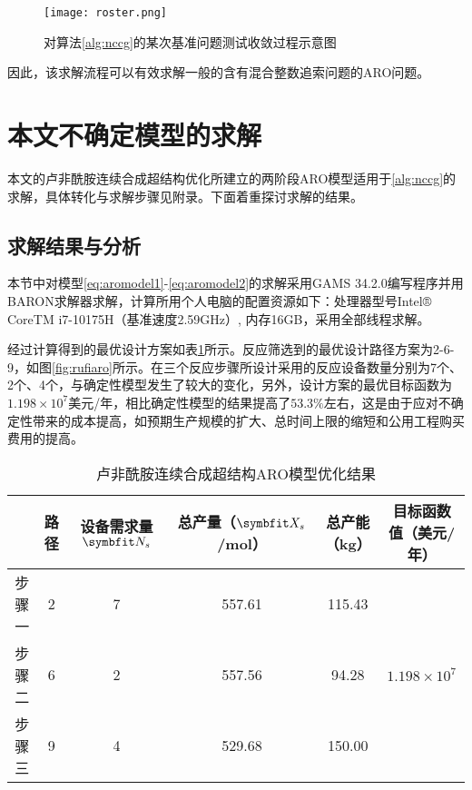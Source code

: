 \begin{figure}[ht!]
  \centering
  \texttt{[image: roster.png]}
  \caption{对算法\ref{alg:nccg}的某次基准问题测试收敛过程示意图}
  \label{fig:roster}
\end{figure}

因此，该求解流程可以有效求解一般的含有混合整数追索问题的ARO问题。

\section{本文不确定模型的求解}

本文的卢非酰胺连续合成超结构优化所建立的两阶段ARO模型适用于\ref{alg:nccg}的求解，具体转化与求解步骤见附录。下面着重探讨求解的结果。

\subsection{求解结果与分析}

本节中对模型\eqref{eq:aromodel1}-\eqref{eq:aromodel2}的求解采用GAMS 34.2.0编写程序并用BARON求解器\cite{kilinc2018}求解，计算所用个人电脑的配置资源如下：处理器型号Intel® CoreTM i7-10175H（基准速度2.59GHz）, 内存16GB，采用全部线程求解。

经过计算得到的最优设计方案如表\ref{tab:rufiaro}所示。反应筛选到的最优设计路径方案为2-6-9，如图\ref{fig:rufiaro}所示。在三个反应步骤所设计采用的反应设备数量分别为7个、2个、4个，与确定性模型发生了较大的变化，另外，设计方案的最优目标函数为$1.198\times10^7$美元/年，相比确定性模型的结果提高了$53.3\%$左右，这是由于应对不确定性带来的成本提高，如预期生产规模的扩大、总时间上限的缩短和公用工程购买费用的提高。

\begin{table}[ht!]
  \centering
  \begin{threeparttable}[c]
    \caption{卢非酰胺连续合成超结构ARO模型优化结果}
    \label{tab:rufiaro}
    \begin{tabular}{cccccc}
      \toprule
       & 路径 & 设备需求量$\symbfit N_s$ & 总产量（$\symbfit X_s$/mol） & 总产能（kg）& 目标函数值（美元/年） \\
      \midrule
      步骤一 & 2   &  7   &  557.61	 &  115.43   &  \multirow[c]{3}{*}{$1.198\times 10^7$} \\
      步骤二 & 6   &  2   &  557.56	 &  94.28   & \\
      步骤三 & 9   &  4  &  529.68	 &  150.00  & \\
      \bottomrule
    \end{tabular}
  \end{threeparttable}
\end{table}

